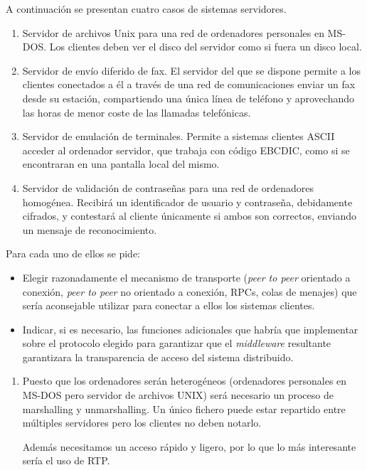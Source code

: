   \begin{problem}[14]
  A continuación se presentan cuatro casos de sistemas servidores.
  \begin{enumerate}
    \item Servidor de archivos Unix para una red de ordenadores personales en MS-DOS.
    Los clientes deben ver el disco del servidor como si fuera un disco local.
    \item Servidor de envío diferido de fax. El servidor del que se dispone permite a
los clientes conectados a él a través de una red de comunicaciones enviar un
fax desde su estación, compartiendo una única línea de teléfono y aprovechando
las horas de menor coste de las llamadas telefónicas.
    \item Servidor de emulación de terminales. Permite a sistemas clientes
ASCII acceder al ordenador servidor, que trabaja con código EBCDIC, como si se
encontraran en una pantalla local del mismo.
    \item Servidor de validación de contraseñas para una red de ordenadores
homogénea. Recibirá un identificador de usuario y contraseña, debidamente
cifrados, y contestará al cliente únicamente si ambos son correctos, enviando un mensaje de reconocimiento.
  \end{enumerate}
  Para cada uno de ellos se pide:
  \begin{itemize}
    \item Elegir razonadamente el mecanismo de transporte (\textit{peer to peer} orientado a conexión, \textit{peer to peer }no orientado a conexión, RPCs, colas de menajes) que sería aconsejable utilizar para conectar a ellos los sistemas clientes.
    \item Indicar, si es necesario, las funciones adicionales que
habría que implementar sobre el protocolo elegido para garantizar que el
 \textit{middleware }resultante garantizara la transparencia de acceso del sistema distribuido.
  \end{itemize}
    \solution


    \begin{enumerate}
    \item

    Puesto que los ordenadores serán heterogéneos (ordenadores personales en MS-DOS pero servidor de archivos UNIX)  será necesario un proceso de marshalling y unmarshalling. Un único fichero puede estar repartido entre múltiples servidores pero los clientes no deben notarlo.

    Además necesitamos un acceso rápido y ligero, por lo que lo más interesante sería el uso de RTP.


\end{enumerate}
\end{problem}
